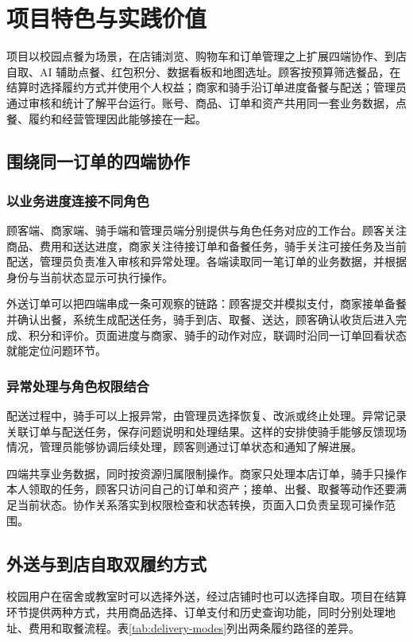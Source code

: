 \chapter{项目特色与实践价值}
项目以校园点餐为场景，在店铺浏览、购物车和订单管理之上扩展四端协作、到店自取、AI 辅助点餐、红包积分、数据看板和地图选址。顾客按预算筛选餐品，在结算时选择履约方式并使用个人权益；商家和骑手沿订单进度备餐与配送；管理员通过审核和统计了解平台运行。账号、商品、订单和资产共用同一套业务数据，点餐、履约和经营管理因此能够接在一起。

\section{围绕同一订单的四端协作}
\subsection{以业务进度连接不同角色}
顾客端、商家端、骑手端和管理员端分别提供与角色任务对应的工作台。顾客关注商品、费用和送达进度，商家关注待接订单和备餐任务，骑手关注可接任务及当前配送，管理员负责准入审核和异常处理。各端读取同一笔订单的业务数据，并根据身份与当前状态显示可执行操作。

外送订单可以把四端串成一条可观察的链路：顾客提交并模拟支付，商家接单备餐并确认出餐，系统生成配送任务，骑手到店、取餐、送达，顾客确认收货后进入完成、积分和评价。页面进度与商家、骑手的动作对应，联调时沿同一订单回看状态就能定位问题环节。

\subsection{异常处理与角色权限结合}
配送过程中，骑手可以上报异常，由管理员选择恢复、改派或终止处理。异常记录关联订单与配送任务，保存问题说明和处理结果。这样的安排使骑手能够反馈现场情况，管理员能够协调后续处理，顾客则通过订单状态和通知了解进展。

四端共享业务数据，同时按资源归属限制操作。商家只处理本店订单，骑手只操作本人领取的任务，顾客只访问自己的订单和资产；接单、出餐、取餐等动作还要满足当前状态。协作关系落实到权限检查和状态转换，页面入口负责呈现可操作范围。

\section{外送与到店自取双履约方式}
校园用户在宿舍或教室时可以选择外送，经过店铺时也可以选择自取。项目在结算环节提供两种方式，共用商品选择、订单支付和历史查询功能，同时分别处理地址、费用和取餐流程。表\ref{tab:delivery-modes}列出两条履约路径的差异。

